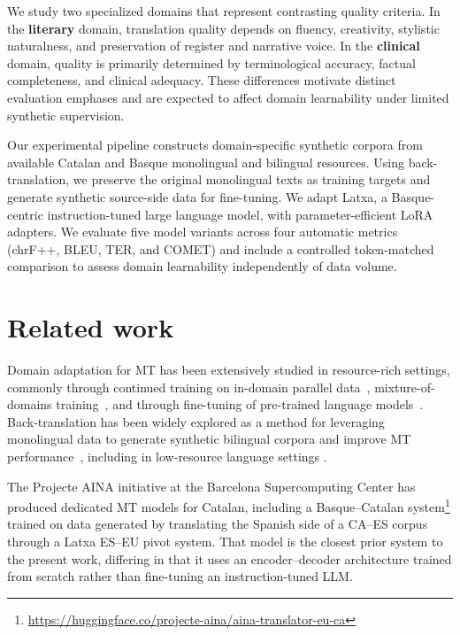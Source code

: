 \documentclass[11pt,a4paper]{article}
\begin{document}
We study two specialized domains that represent contrasting quality
criteria. In the \textbf{literary} domain, translation quality depends
on fluency, creativity, stylistic naturalness, and preservation of
register and narrative voice. In the \textbf{clinical} domain, quality
is primarily determined by terminological accuracy, factual completeness,
and clinical adequacy. These differences motivate distinct evaluation
emphases and are expected to affect domain learnability under
limited synthetic supervision.

Our experimental pipeline constructs domain-specific synthetic corpora from available Catalan and Basque monolingual and bilingual resources. Using back-translation, we preserve the original monolingual texts as training targets and generate synthetic source-side data for fine-tuning. We adapt Latxa, a Basque-centric instruction-tuned large language model, with parameter-efficient LoRA adapters. We evaluate five model variants across four automatic
metrics (chrF++, BLEU, TER, and COMET) and include a controlled
token-matched comparison to assess domain learnability independently
of data volume.

\section{Related work}

Domain adaptation for MT has been extensively studied in
resource-rich settings, commonly through continued training on
in-domain parallel data~\cite{Freitag2016}, mixture-of-domains
training~\cite{ling2025diversityrewardfinetuningllms}, and through fine-tuning
of pre-trained language models~\cite{alves-etal-2023-steering}. Back-translation has been widely explored as a method for leveraging
monolingual data to generate synthetic bilingual corpora and improve MT
performance~\cite{luu-etal-2026-machine,bojar-tamchyna-2011-improving, edunov-etal-2018-understanding}, including in low-resource language settings \cite{xu2019backtranslation}.


The Projecte AINA initiative \cite{villegas2023aina} at the Barcelona Supercomputing Center
has produced dedicated MT models for Catalan, including a Basque--Catalan
system\footnote{\url{https://huggingface.co/projecte-aina/aina-translator-eu-ca}} trained on data
generated by translating the Spanish side of a CA--ES corpus through
a Latxa ES--EU pivot system. That model is the closest prior system to
the present work, differing in that it uses an
encoder--decoder architecture trained from scratch rather than
fine-tuning an instruction-tuned LLM.
 
\end{document}
